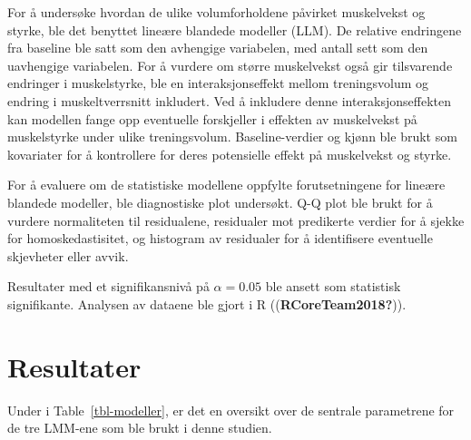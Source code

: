 \documentclass[
  letterpaper,
  DIV=11,
  numbers=noendperiod]{scrreprt}
\begin{document}
For å undersøke hvordan de ulike volumforholdene påvirket muskelvekst og
styrke, ble det benyttet lineære blandede modeller (LLM). De relative
endringene fra baseline ble satt som den avhengige variabelen, med
antall sett som den uavhengige variabelen. For å vurdere om større
muskelvekst også gir tilsvarende endringer i muskelstyrke, ble en
interaksjonseffekt mellom treningsvolum og endring i muskeltverrsnitt
inkludert. Ved å inkludere denne interaksjonseffekten kan modellen fange
opp eventuelle forskjeller i effekten av muskelvekst på muskelstyrke
under ulike treningsvolum. Baseline-verdier og kjønn ble brukt som
kovariater for å kontrollere for deres potensielle effekt på muskelvekst
og styrke.

For å evaluere om de statistiske modellene oppfylte forutsetningene for
lineære blandede modeller, ble diagnostiske plot undersøkt. Q-Q plot ble
brukt for å vurdere normaliteten til residualene, residualer mot
predikerte verdier for å sjekke for homoskedastisitet, og histogram av
residualer for å identifisere eventuelle skjevheter eller avvik.

Resultater med et signifikansnivå på \(\alpha = 0.05\) ble ansett som
statistisk signifikante. Analysen av dataene ble gjort i R
((\textbf{RCoreTeam2018?})).


\chapter{Resultater}\label{resultater-1}

Under i Table~\ref{tbl-modeller}, er det en oversikt over de sentrale
parametrene for de tre LMM-ene som ble brukt i denne studien.
\end{document}
